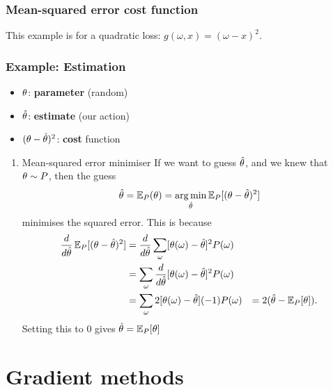 \documentclass[smaller]{article}
\begin{document}
\subsubsection{Mean-squared error cost function}
\label{sec:org70c69ee}
This example is for a quadratic loss: \(g(\omega, x) = (\omega - x)^2\).

\subsubsection{Example: Estimation}
\label{sec:org72db4bf}
\begin{itemize}
\item \(\theta\): \textbf{parameter} (random)
\item \(\hat{\theta}\): \textbf{estimate} (our action)
\item \((\theta - \hat{\theta})^2\): \textbf{cost} function
\end{itemize}
\begin{enumerate}
\item Mean-squared error minimiser
\label{sec:org72a8ddb}
If we want to guess \(\hat{\theta}\), and we knew that \(\theta \sim P\), then the guess
\[
\hat{\theta} = \mathop{\mbox{\ensuremath{\mathbb{E}}}}\nolimits_P(\theta) = \operatorname*{arg\,min}_{\hat{\theta}} \mathop{\mbox{\ensuremath{\mathbb{E}}}}\nolimits_P [(\theta - \hat{\theta})^2]
\]
minimises the squared error. 
This is because
\begin{align}
\frac{d}{d \hat{\theta}}
 \mathop{\mbox{\ensuremath{\mathbb{E}}}}\nolimits_P [(\theta - \hat{\theta})^2]
&=
\frac{d}{d \hat{\theta}}
 \sum_\omega [\theta(\omega) -  \hat{\theta}]^2 P(\omega)\\
&=
 \sum_\omega \frac{d}{d \hat{\theta}}
 [\theta(\omega) -  \hat{\theta}]^2 P(\omega)\\
&=
 \sum_\omega 2 [\theta(\omega) -  \hat{\theta}] (-1) P(\omega)
&=
	 2 (\hat{\theta} - \mathop{\mbox{\ensuremath{\mathbb{E}}}}\nolimits_P [\theta]).
\end{align}
Setting this to \(0\) gives \(\hat{\theta} =\mathop{\mbox{\ensuremath{\mathbb{E}}}}\nolimits_P [\theta]\)
\end{enumerate}

\section{Gradient methods}
\label{sec:org63673bc}
\end{document}
